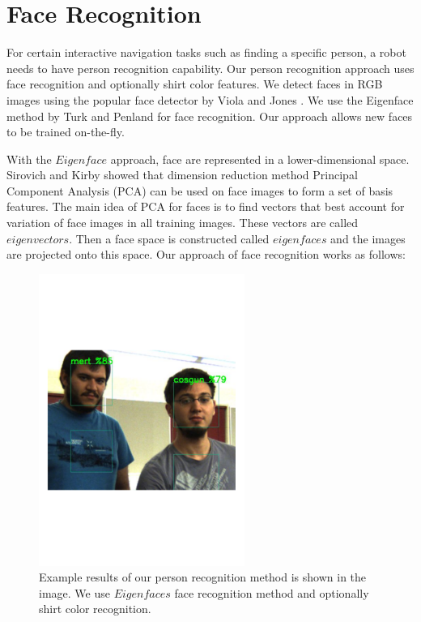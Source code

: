  




\section{Face Recognition}
\label{sec:multimodal_face_recognition}

For certain interactive navigation tasks such as finding a specific person, a robot needs to have person recognition capability. Our person recognition approach uses face recognition and optionally shirt color features. We detect faces in RGB images using the popular face detector by Viola and Jones \cite{viola2004robust}. We use the Eigenface method by Turk and Penland \cite{turk1991face} for face recognition. Our approach allows new faces to be trained on-the-fly.

With the $Eigenface$ approach, face are represented in a lower-dimensional space. Sirovich and Kirby \cite{sirovich1987low} showed that dimension reduction method Principal Component Analysis (PCA) can be used on face images to form a set of basis features. The main idea of PCA for faces is to find vectors that best account for variation of face images in all training images. These vectors are called $eigenvectors$. Then a face space is constructed called $eigenfaces$ and the images are projected onto this space. Our approach of face recognition works as follows:

\begin{figure}[ht!]
\centering
\includegraphics[width=0.6\textwidth]{pics/person_recognition}
\caption{Example results of our person recognition method is shown in the image. We use $Eigenfaces$ face recognition method and optionally shirt color recognition.}
\label{fig:person_recognition}
\end{figure}

